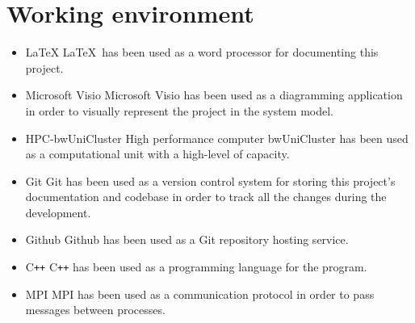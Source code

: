 \section{Working environment}
	\begin{itemize}
	\item \LaTeX  \newline
	\LaTeX\ has been used as a word processor for documenting this project.
	
	\item Microsoft Visio \newline
	Microsoft Visio	has been used as a diagramming application in order to visually represent the project in the system model.
	
	\item HPC-bwUniCluster \newline
	High performance computer bwUniCluster has been used as a computational unit with a high-level of capacity.
	
	\item Git \newline
	Git has been used as a version control system for storing this project's documentation and codebase in order to track all the changes during the development.	
	
	\item Github \newline
	Github has been used as a Git repository hosting service.
	
	\item C\texttt{++} \newline
	C\texttt{++} has been used as a programming language for the program.
	
	\item MPI \newline
	MPI has been used as a communication protocol in order to pass messages between processes.
	\end{itemize}

